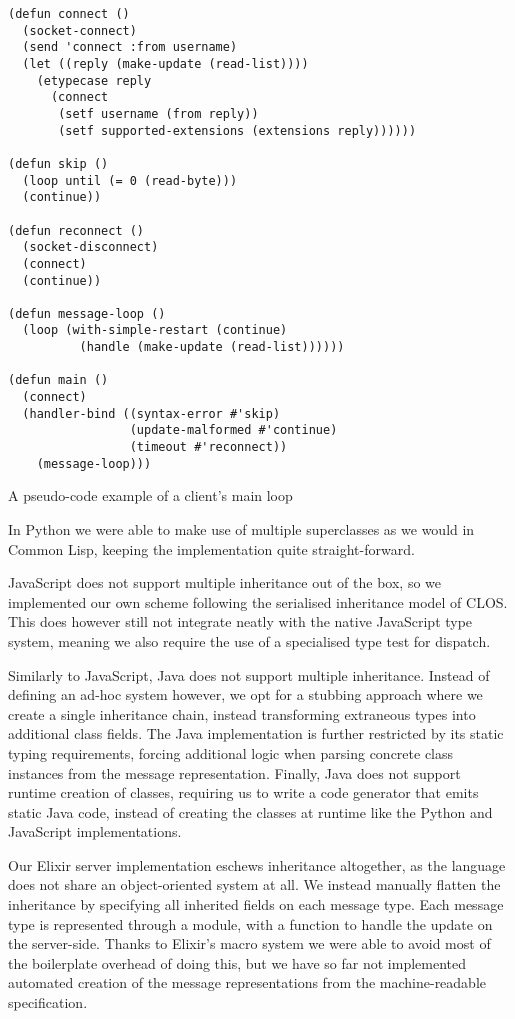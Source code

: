 \documentclass[format=sigconf]{acmart}
\begin{document}
\begin{listing}
\begin{verbatim}
(defun connect ()
  (socket-connect)
  (send 'connect :from username)
  (let ((reply (make-update (read-list))))
    (etypecase reply
      (connect
       (setf username (from reply))
       (setf supported-extensions (extensions reply))))))

(defun skip ()
  (loop until (= 0 (read-byte)))
  (continue))

(defun reconnect ()
  (socket-disconnect)
  (connect)
  (continue))

(defun message-loop ()
  (loop (with-simple-restart (continue)
          (handle (make-update (read-list))))))

(defun main ()
  (connect)
  (handler-bind ((syntax-error #'skip)
                 (update-malformed #'continue)
                 (timeout #'reconnect))
    (message-loop)))
\end{verbatim}
\caption{A pseudo-code example of a client's main loop}
\label{lst:client}
\end{listing}

In Python we were able to make use of multiple superclasses as we would in Common Lisp, keeping the implementation quite straight-forward.

JavaScript does not support multiple inheritance out of the box, so we implemented our own scheme following the serialised inheritance model of CLOS. This does however still not integrate neatly with the native JavaScript type system, meaning we also require the use of a specialised type test for dispatch.

Similarly to JavaScript, Java does not support multiple inheritance. Instead of defining an ad-hoc system however, we opt for a stubbing approach where we create a single inheritance chain, instead transforming extraneous types into additional class fields. The Java implementation is further restricted by its static typing requirements, forcing additional logic when parsing concrete class instances from the message representation. Finally, Java does not support runtime creation of classes, requiring us to write a code generator that emits static Java code, instead of creating the classes at runtime like the Python and JavaScript implementations.

Our Elixir server implementation eschews inheritance altogether, as the language does not share an object-oriented system at all. We instead manually flatten the inheritance by specifying all inherited fields on each message type. Each message type is represented through a module, with a function to handle the update on the server-side. Thanks to Elixir's macro system we were able to avoid most of the boilerplate overhead of doing this, but we have so far not implemented automated creation of the message representations from the machine-readable specification.
\end{document}
